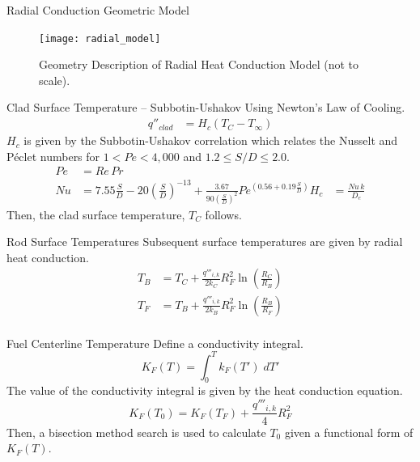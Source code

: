 \begin{frame}{Radial Conduction Geometric Model}
  \begin{figure}
    \centering
    \texttt{[image: radial\_model]}
    \caption{Geometry Description of Radial Heat Conduction Model (not to
      scale).}
    \label{fig:radial_model}
  \end{figure}
\end{frame}

\begin{frame}{Clad Surface Temperature -- Subbotin-Ushakov}
  Using Newton's Law of Cooling.
  \begin{align}
    q''_{clad} &= H_c (T_C - T_{\infty}) %
  \end{align}
  $H_c$ is given by the Subbotin-Ushakov correlation \cite{subbotinUshakov}
  which relates the Nusselt and P\'eclet numbers for ${1 < Pe < 4,000}$ and 
  ${ 1.2 \le S/D \le 2.0 }$.
  \begin{align}
    Pe &= Re \, Pr \\
    \label{eq:subbotinUshakov}
    Nu &= 7.55 \frac{S}{D} - 20 \left(\frac{S}{D}\right)^{-13} + 
      \frac{3.67}{90\left(\frac{S}{D}\right)^{2}}
      Pe^{\left(0.56 + 0.19 \frac{S}{D}\right)}
    H_c &= \frac{N\!u \, k}{D_e} %
  \end{align}
  Then, the clad surface temperature, $T_C$ follows.
\end{frame}

\begin{frame}{Rod Surface Temperatures}
  Subsequent surface temperatures are given by radial heat conduction.
  \begin{align}
    \label{eq:tb_forward}
    T_B &= T_C + \frac{q'''_{i,k}}{2 k_C} R_F^2
      \ln\left(\frac{R_C}{R_B}\right) \\
    \label{eq:tf_forward}
    T_F &= T_B + \frac{q'''_{i,k}}{2 k_B} R_F^2 
      \ln\left(\frac{R_B}{R_F}\right) \\
  \end{align}
\end{frame}

\begin{frame}{Fuel Centerline Temperature}
  Define a conductivity integral.
  \begin{equation}
    \label{eq:conductivity_integral}
    K_F(T) = \int_0^T k_F(T') \; dT'
  \end{equation}
  The value of the conductivity integral is given by the heat conduction
  equation.
  \begin{equation}
    \label{eq:tcl_conductivity_integral}
    K_F(T_0) = K_F(T_F) + \frac{q'''_{i,k}}{4} R_F^2
  \end{equation}
  Then, a bisection method search is used to calculate $T_0$ given a functional
  form of $K_F(T)$.
\end{frame}

